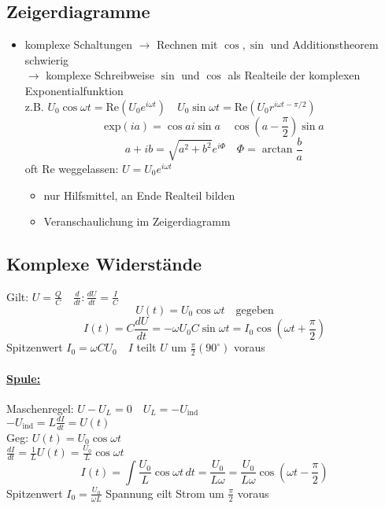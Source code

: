 \documentclass[titlepage,12pt,a4paper,ngerman]{report}
\newcommand{\tx}[1]{\textrm{#1}}
\newcommand{\uind}{U_{\tx{ind}}}
\begin{document}
\subsection{Zeigerdiagramme}
\begin{itemize}
	\item komplexe Schaltungen $ \rightarrow $ Rechnen mit $ \cos ,\sin $ und Additionstheorem schwierig\\
	$ \rightarrow $ komplexe Schreibweise $ \sin $ und $ \cos $ als Realteile der komplexen Exponentialfunktion\\
	z.B. $ U_0 \cos \omega t = \tx{Re}(U_0 e^{i \omega t} ) \quad U_0 \sin \omega t = \tx{Re} ( U_0 r ^{i \omega t - \pi/2}) $\\
	$$ \tx{exp}(i a) = \cos a i \sin a \quad \cos (a- \frac{\pi}{2}) \sin a $$
	$$ a+ib = \sqrt{a^2 + b^2} e^{i\Phi} \quad \Phi = \arctan \frac{b}{a} $$
	oft Re weggelassen: $ U = U_0 e^{i\omega t} $
	\begin{itemize}
		\item nur Hilfsmittel, an Ende Realteil bilden
		\item  Veranschaulichung im Zeigerdiagramm
	\end{itemize}
\end{itemize}

\subsection{Komplexe Widerstände}
Gilt: $ U = \frac{Q}{C} \quad \frac{d}{dt}: \frac{dU}{dt} = \frac{I}{C} $\\
$$ U(t) = U_0 \cos \omega t \quad \tx{gegeben} $$
$$ I(t) = C \frac{dU}{dt} = - \omega U_0 C \sin \omega t = I_0 \cos (\omega t + \frac{\pi}{2}) $$
Spitzenwert $ I_0 = \omega C U_0 \quad I $ teilt $ U $ um $ \frac{\pi}{2} (90^\circ) $ voraus\\
\paragraph{\underline{Spule:}} Maschenregel: $ U-U_L = 0 \quad U_L = - \uind $\\
$ - \uind = L \frac{dI}{dt} = U(t) $\\
Geg: $ U(t) = U_0 \cos \omega t $\\
$ \frac{dI}{dt} = \frac{1}{L} U(t) = \frac{U_0}{L} \cos \omega t $\\
$$ I(t) = \int \frac{U_0}{L} \cos \omega t \, dt = \frac{U_0}{L\omega} = \frac{U_0}{L\omega} \cos ( \omega t - \frac{\pi}{2}) $$
Spitzenwert $ I_0 = \frac{U_0}{\omega L} $ Spannung eilt Strom um $ \frac{\pi}{2} $ voraus
\end{document}
